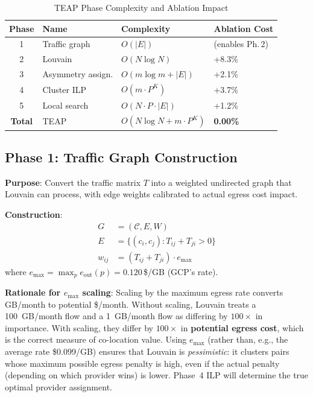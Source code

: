 \documentclass[10pt,journal]{IEEEtran}
\begin{document}
\begin{table}[ht]
\centering
\caption{TEAP Phase Complexity and Ablation Impact}
\label{tab:complexity}
\begin{tabular}{clll}
\toprule
Phase & Name & Complexity & Ablation Cost\\
\midrule
1 & Traffic graph      & $O(|E|)$               & (enables Ph.\,2)\\
2 & Louvain            & $O(N\log N)$           & +8.3\%\\
3 & Asymmetry assign.  & $O(m\log m + |E|)$     & +2.1\%\\
4 & Cluster ILP        & $O(m \cdot P^K)$      & +3.7\%\\
5 & Local search       & $O(N\cdot P\cdot|E|)$ & +1.2\%\\
\midrule
\textbf{Total} & TEAP & $O(N\log N + m\cdot P^K)$ & \textbf{0.00\%}\\
\bottomrule
\end{tabular}
\end{table}

\subsection{Phase 1: Traffic Graph Construction}

\textbf{Purpose}: Convert the traffic matrix $T$ into a weighted undirected graph
that Louvain can process, with edge weights calibrated to actual egress cost impact.

\textbf{Construction}:
\begin{align}
G &= (\mathcal{C}, E, W)\\
E &= \{(c_i,c_j) : T_{ij}+T_{ji} > 0\}\\
w_{ij} &= (T_{ij}+T_{ji}) \cdot e_{\max}
\end{align}
where $e_{\max} = \max_p e_{\text{out}}(p) = 0.120$\,\$/GB (GCP's rate).

\textbf{Rationale for $e_{\max}$ scaling}:
Scaling by the maximum egress rate converts GB/month to potential \$/month.
Without scaling, Louvain treats a 100~GB/month flow and a 1~GB/month flow as
differing by $100\times$ in importance.
With scaling, they differ by $100\times$ in \textbf{potential egress cost}, which
is the correct measure of co-location value.
Using $e_{\max}$ (rather than, e.g., the average rate \$0.099/GB) ensures that
Louvain is \emph{pessimistic}: it clusters pairs whose maximum possible egress
penalty is high, even if the actual penalty (depending on which provider wins) is lower.
Phase~4 ILP will determine the true optimal provider assignment.
\end{document}
